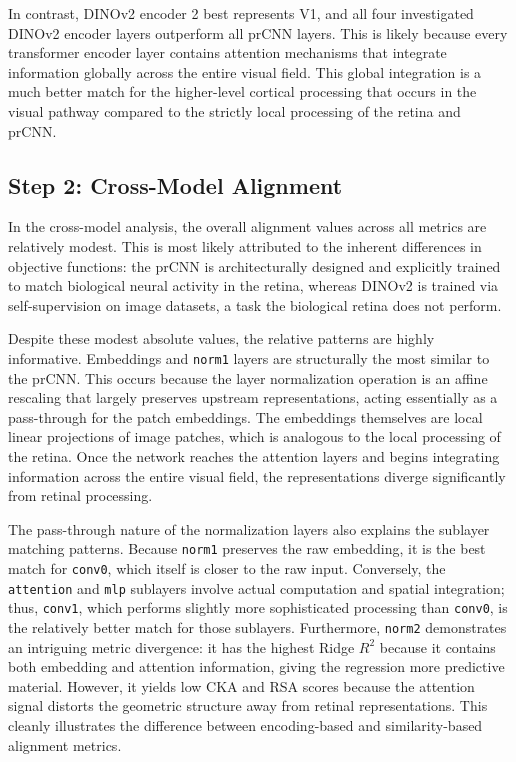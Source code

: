 \documentclass{article}
\begin{document}
In contrast, DINOv2 encoder 2 best represents V1, and all four
investigated DINOv2 encoder layers outperform all prCNN layers. This is
likely because every transformer encoder layer contains attention
mechanisms that integrate information globally across the entire
visual field. This global integration is a much better match for the
higher-level cortical processing that occurs in the visual pathway
compared to the strictly local processing of the retina and prCNN.

\subsection{Step 2: Cross-Model Alignment}
In the cross-model analysis, the overall alignment values across all
metrics are relatively modest. This is most likely attributed to the
inherent differences in objective functions: the prCNN is
architecturally designed and explicitly trained to match biological
neural activity in the retina, whereas DINOv2 is trained via
self-supervision on image datasets, a task the biological retina does
not perform.

Despite these modest absolute values, the relative patterns are
highly informative. Embeddings and \texttt{norm1} layers are
structurally the most similar to the prCNN. This occurs because
the layer normalization operation is an affine rescaling that largely
preserves upstream representations, acting essentially as a
pass-through for the patch embeddings. The embeddings themselves are
local linear projections of image patches, which is analogous to the
local processing of the retina. Once the network reaches the
attention layers and begins integrating information across the entire
visual field, the representations diverge significantly from retinal
processing.

The pass-through nature of the normalization layers also explains the
sublayer matching patterns. Because \texttt{norm1} preserves the raw
embedding, it is the best match for \texttt{conv0}, which itself is
closer to the raw input. Conversely, the \texttt{attention} and
\texttt{mlp} sublayers involve actual computation and spatial
integration; thus, \texttt{conv1}, which performs slightly more sophisticated
processing than \texttt{conv0}, is the relatively better match for
those sublayers. Furthermore, \texttt{norm2} demonstrates an
intriguing metric divergence: it has the highest Ridge $R^2$ because
it contains both embedding and attention information, giving the
regression more predictive material. However, it yields low CKA and
RSA scores because the attention signal distorts the geometric
structure away from retinal representations. This cleanly illustrates
the difference between encoding-based and similarity-based alignment
metrics.
\end{document}
